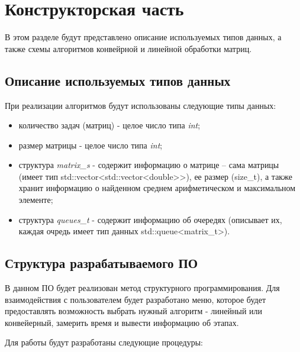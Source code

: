 \chapter{Конструкторская часть}
В этом разделе будут представлено описание используемых типов данных, а также схемы алгоритмов конвейрной и линейной обработки матриц.

\section{Описание используемых типов данных}

При реализации алгоритмов будут использованы следующие типы данных:

\begin{itemize}
	\item количество задач (матриц) - целое число типа \textit{int};
	\item размер матрицы - целое число типа \textit{int};
	\item структура \textit{matrix\_s} - содержит информацию о матрице -- сама матрицы (имеет тип std::vector<std::vector<double>>), ее размер (size\_t), а также хранит информацию о найденном среднем арифметическом и максимальном элементе;
	\item структура \textit{queues\_t} - содержит информацию об очередях (описывает их, каждая очредь имеет тип данных std::queue<matrix\_t>).
\end{itemize}


\section{Структура разрабатываемого ПО}

В данном ПО будет реализован метод структурного программирования. Для взаимодействия с пользователем будет разработано меню, которое будет предоставлять возможность выбрать нужный алгоритм - линейный или конвейерный, замерить время и вывести информацию об этапах. 

Для работы будут разработаны следующие процедуры:

